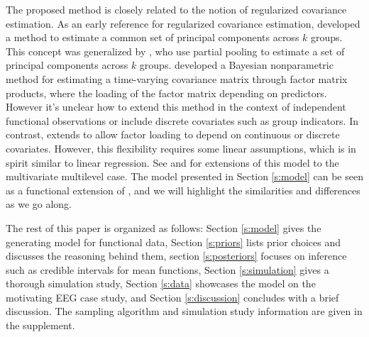 \documentclass[useAMS,usenatbib]{biom}
\begin{document}
The proposed method is closely related to the notion of regularized covariance estimation. As an early reference for regularized covariance estimation, \citet{Flury1984} developed a method to estimate a common set of principal components across $k$ groups. This concept was generalized by \citet{Franks2019}, who use partial pooling to estimate a set of principal components across $k$ groups. \citet{Fox2015} developed a Bayesian nonparametric method for estimating a time-varying covariance matrix through factor matrix products, where the loading of the factor matrix depending on predictors. However it's unclear how to extend this method in the context of independent functional observations or include discrete covariates such as group indicators. In contrast, \citet{Hoff2012} extends to allow factor loading to depend on continuous or discrete covariates. However, this flexibility requires some linear assumptions, which is in spirit similar to linear regression. See \citet{Li2014} and \citet{Quintero2017} for extensions of this model to the multivariate multilevel case. The model presented in Section \ref{s:model} can be seen as a functional extension of \citet{Hoff2012}, and we will highlight the similarities and differences as we go along. 

The rest of this paper is organized as follows: Section \ref{s:model} gives the generating model for functional data, Section \ref{s:priors} lists prior choices and discusses the reasoning behind them, section \ref{s:posteriors} focuses on inference such as credible intervals for mean functions, Section \ref{s:simulation} gives a thorough simulation study, Section \ref{s:data} showcases the model on the motivating EEG case study, and Section \ref{s:discussion} concludes with a brief discussion. The sampling algorithm and  simulation study information are given in the supplement.
\end{document}
